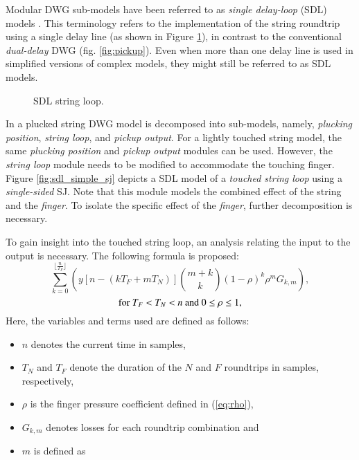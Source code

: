 \documentclass{sigchi}
\begin{document}
Modular DWG sub-models have been referred to as \textit{single delay-loop} (SDL) models \cite{karjalainen_plucked-string_1998,pakarinen_physical_2005}. This terminology refers to the implementation of the string roundtrip using a single delay line (as shown in Figure \ref{fig:sdl_string_loop}), in contrast to the conventional \textit{dual-delay} DWG (fig. \ref{fig:pickup}). Even when more than one delay line is used in simplified versions of complex models, they might still be referred to as SDL models.
\begin{figure}[h]
	\centering
	\scalebox{0.75}{}
	\caption{SDL string loop.}
	\label{fig:sdl_string_loop}
\end{figure}
In \cite{karjalainen_plucked-string_1998} a plucked string DWG model is decomposed into sub-models, namely, \textit{plucking position}, \textit{string loop}, and \textit{pickup output}. For a lightly touched string model, the same \textit{plucking position} and \textit{pickup output} modules can be used. However, the \textit{string loop} module needs to be modified to accommodate the touching finger. Figure \ref{fig:sdl_simple_sj} depicts a SDL model of a \textit{touched string loop} using a \textit{single-sided} SJ. Note that this module models the combined effect of the string and the \textit{finger}. To isolate the specific effect of the \textit{finger}, further decomposition is necessary.
\begin{figure*}[h]
	\centering
	\scalebox{0.8}{}
	\caption{String loop with a scattering junction.}
	\label{fig:sdl_simple_sj}
\end{figure*}
To gain insight into the touched string loop, an analysis relating the input to the output is necessary.
The following formula is proposed:
\begin{equation} \label{eq:explicit}
	\sum_{k=0}^{\lfloor \frac{n}{T_F} \rfloor}\left(y[n - (kT_F + mT_N)]\binom{m+k}{k} (1 - \rho)^{k} \rho^mG_{k,m}\right),
\end{equation}
\begin{equation*}
	\textrm{for } T_F<T_N<n \textrm{ and } 0\leq\rho\leq1\notag,
\end{equation*}
Here, the variables and terms used are defined as follows:
\begin{itemize}
	\setlength\itemsep{0.1em}
	\item $n$ denotes the current time in samples,
	\item $T_N$ and $T_F$ denote the duration of the $N$ and $F$ roundtrips in samples, respectively,
	\item $\rho$ is the finger pressure coefficient defined in (\ref{eq:rho}),
	\item $G_{k,m}$ denotes losses for each roundtrip combination and
	\item $m$ is defined as
\end{itemize}
\end{document}
